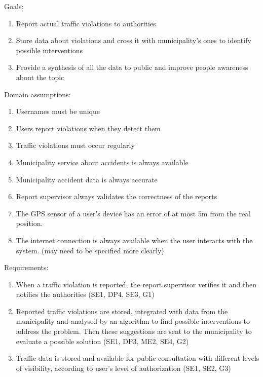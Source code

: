 Goals:
\begin{enumerate}[label={G\arabic*.}]
    \item Report actual traffic violations to authorities
    \item Store data about violations and cross it with municipality's ones to identify possible interventions
    \item Provide a synthesis of all the data to public and improve people awareness about the topic
\end{enumerate}
Domain assumptions:
\begin{enumerate}[label={D\arabic*.}]
	\item Usernames must be unique
    \item Users report violations when they detect them
    \item Traffic violations must occur regularly
    \item Municipality service about accidents is always available
   	\item Municipality accident data is always accurate
    \item Report supervisor always validates the correctness of the reports
    \item The GPS sensor of a user's device has an error of at most 5m from the real position.
    \item The internet connection is always available when the user interacts with the system. (may need to be specified more clearly)
\end{enumerate}
Requirements:
\begin{enumerate}[label={R\arabic*.}]
    \item When a traffic violation is reported, the report supervisor verifies it and then notifies the authorities (SE1, DP4, SE3, G1)
    \item Reported traffic violations are stored, integrated with data from the municipality and analysed by an algorithm to find possible interventions to address the problem. Then these suggestions are sent to the municipality to evaluate a possible solution (SE1, DP3, ME2, SE4, G2)
    \item Traffic data is stored and available for public consultation with different levels of visibility, according to user's level of authorization (SE1, SE2, G3)
\end{enumerate}